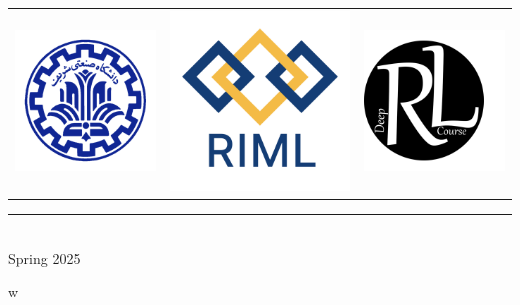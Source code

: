 \documentclass[12pt]{article}
\begin{document}
\begin{center}
{			
			\vspace*{\fill}
			\begin{center}
				\begin{tabular}{ccc}
					\includegraphics[width=0.14\linewidth]{figs/sharif-logo.png} & \includegraphics[width=0.14\linewidth]{figs/riml-logo.png} & \includegraphics[width=0.14\linewidth]{figs/dlr-logo.png} \\
				\end{tabular}
			\end{center}
			
			\vspace*{-.25cm}
			
			{\color{YellowOrange} {
					\rule{10cm}{0.5pt} \\
					\vspace{2pt}
					\large Spring 2025}
		}}w
		\vspace*{-1cm}
		
	\end{center}
	
	
	
	\newpage
	\thispagestyle{plain}
	{\selectfont {\color{BrickRed} \textbf{\tableofcontents} }}
	
\end{document}
